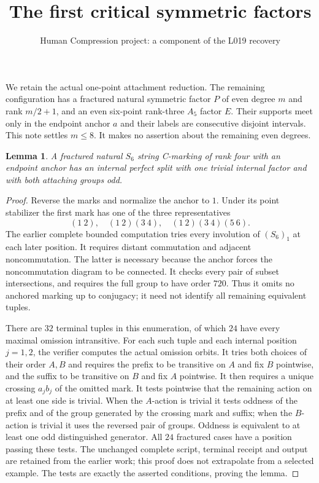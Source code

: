\documentclass[11pt,a4paper]{article}
\title{The first critical symmetric factors}
\author{Human Compression project: a component of the L019 recovery}
\date{}
\newtheorem{lemma}{Lemma}\newtheorem{theorem}[lemma]{Theorem}
\begin{document}
\maketitle
We retain the actual one-point attachment reduction. The remaining
configuration has a fractured natural symmetric factor $P$ of even
degree $m$ and rank $m/2+1$, and an even six-point rank-three $A_5$
factor $E$. Their supports meet only in the endpoint anchor $a$ and
their labels are consecutive disjoint intervals. This note settles
$m\le8$. It makes no assertion about the remaining even degrees.

\begin{lemma}\label{six}
A fractured natural $S_6$ string C-marking of rank four with an
endpoint anchor has an internal perfect split with one trivial
internal factor and with both attaching groups odd.
\end{lemma}
\begin{proof}
Reverse the marks and normalize the anchor to $1$. Under its point
stabilizer the first mark has one of the three representatives
\[
          (1\ 2),\quad (1\ 2)(3\ 4),\quad
                         (1\ 2)(3\ 4)(5\ 6).
\]
The earlier complete bounded computation tries every involution of
$(S_6)_1$ at each later position. It requires distant commutation
and adjacent noncommutation. The latter is necessary because the
anchor forces the noncommutation diagram to be connected. It checks
every pair of subset intersections, and requires the full group to
have order $720$. Thus it omits no anchored marking up to conjugacy;
it need not identify all remaining equivalent tuples.

There are $32$ terminal tuples in this enumeration, of which $24$
have every maximal omission intransitive. For each such tuple and
each internal position $j=1,2$, the verifier computes the actual
omission orbits. It tries both choices of their order $A,B$ and
requires the prefix to be transitive on $A$ and fix $B$ pointwise,
and the suffix to be transitive on $B$ and fix $A$ pointwise.
It then requires a unique crossing $a_jb_j$ of the omitted mark.
It tests pointwise that the remaining action on at least one side
is trivial. When the $A$-action is trivial it tests oddness of the
prefix and of the group generated by the crossing mark and suffix;
when the $B$-action is trivial it uses the reversed pair of groups.
Oddness is equivalent to at least one odd distinguished generator.
All $24$ fractured cases have a position passing these tests.
The unchanged complete script, terminal receipt and output are
retained from the earlier work; this proof does not extrapolate
from a selected example. The tests are exactly the asserted
conditions, proving the lemma.
\end{proof}
\end{document}
